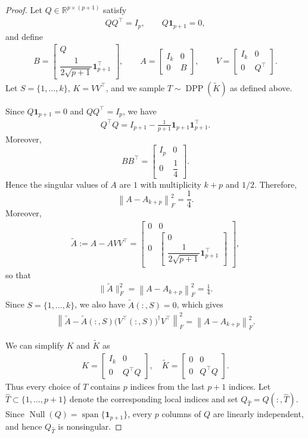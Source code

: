 \documentclass[11pt]{article}
\newcommand{\be}{\begin{eqnarray}}
\newcommand{\ee}{\end{eqnarray}}
\newcommand{\<}{\langle}
\renewcommand{\>}{\rangle}
\begin{document}
\begin{proof}
Let $Q\in\mathbb{R}^{p\times(p+1)}$ satisfy
\be
QQ^\top=I_p,
\qquad
Q\mathbf{1}_{p+1}=0,
\ee
and define
\be
B=
\begin{bmatrix}
Q\\[1mm]
\dfrac{1}{2\sqrt{p+1}}\mathbf{1}_{p+1}^\top
\end{bmatrix},
\qquad
A=
\begin{bmatrix}
I_k & 0\\
0 & B
\end{bmatrix},
\qquad
V=
\begin{bmatrix}
I_k & 0\\
0 & Q^\top
\end{bmatrix}.
\ee
Let $S=\{1,\ldots,k\},
\,
K=VV^\top$,
and we sample
$T\sim\operatorname{DPP}(\widetilde K)$ as defined above.

Since $Q\mathbf{1}_{p+1}=0$ and $QQ^\top=I_p$, we have
\be
Q^\top Q
=
I_{p+1}
-
\frac{1}{p+1}
\mathbf{1}_{p+1}\mathbf{1}_{p+1}^\top.
\ee
Moreover,
\[
BB^\top
=
\begin{bmatrix}
I_p & 0\\
0 & \dfrac14
\end{bmatrix}.
\]
Hence the singular values of $A$ are $1$ with multiplicity $k+p$ and $1/2$. Therefore,
\[
\left\|A-A_{k+p}\right\|_F^2=\frac14.
\]
Moreover,
\be
\widetilde A
:=
A-AVV^\top
=
\begin{bmatrix}
0 & 0\\
0 &
\begin{bmatrix}
0\\
\dfrac{1}{2\sqrt{p+1}}\mathbf{1}_{p+1}^\top
\end{bmatrix}
\end{bmatrix},
\ee
so that
\be
\|\widetilde A\|_F^2
=
\left\|
A-A_{k+p}
\right\|_F^2= \frac14.
\ee
Since $S=\{1,\ldots,k\}$, we also have
$\widetilde A(:,S)=0$,
which gives
\be
\left\|
\widetilde A
-
\widetilde A(:,S)
\bigl(V^\top(:,S)\bigr)^\dagger
V^\top
\right\|_F^2
=
\left\|
A-A_{k+p}
\right\|_F^2.
\ee

We can simplify $K$ and $\widetilde K$ as
\be
K=
\begin{bmatrix}
I_k & 0\\
0 & Q^\top Q
\end{bmatrix},
\quad
\widetilde K
=
\begin{bmatrix}
0 & 0\\
0 & Q^\top Q
\end{bmatrix}.
\ee
Thus every choice of $T$ contains $p$ indices from the last
$p+1$ indices. Let $\widehat T\subset\{1,\ldots,p+1\}$ denote the
corresponding local indices and set
$
Q_{\widehat T}=Q(:,\widehat T).
$
Since $\operatorname{Null}(Q)=\operatorname{span}
\{\mathbf{1}_{p+1}\}$, every $p$ columns of $Q$ are linearly
independent, and hence $Q_{\widehat T}$ is nonsingular.


\end{proof}
\end{document}

